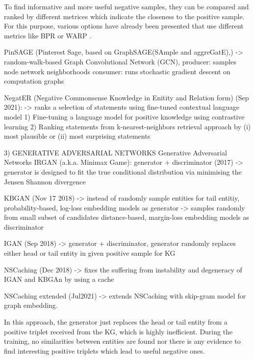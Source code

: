 To find informative and more useful negative samples, they can be compared and ranked by different metrices which indicate the closeness to the positive sample.
For this purpose, various options have already been presented that use different metrics like \ac{BPR} \cite{DNS} or \ac{WARP} \cite{WARP}. 






    PinSAGE (Pinterest Sage, based on GraphSAGE(SAmple and aggreGatE),)
    -> random-walk-based Graph Convolutional Network (GCN),
    producer: samples node network neighborhoods
    consumer: runs stochastic gradient descent on computation graphs    


    NegatER (Negative Commonsense Knowledge in Enitity and Relation form) (Sep 2021):
    -> ranks a selection of statements using fine-tuned contextual language model
    1) Fine-tuning a language model for positive knowledge using contrastive learning
    2) Ranking statements from k-nearest-neighbors retrieval approach by (i) most plausible or (ii) most surprising statements
    
    
    
3) GENERATIVE ADVERSARIAL NETWORKS
    Generative Adversarial Networks
    IRGAN (a.k.a. Minimax Game): generator + discriminator  (2017) 
    -> generator is designed to fit the true conditional distribution via minimising the Jensen Shannon divergence
    
    KBGAN (Nov 17 2018)
    -> instead of randomly sample entities for tail entitiy,
    probability-based, log-loss embedding models as generator
    -> samples randomly from small subset of candidates
    distance-based, margin-loss embedding models as discriminator
    
    IGAN (Sep 2018) 
    -> generator + discriminator, generator randomly replaces either head or tail entity in given positive sample for KG
    
    NSCaching (Dec 2018)
    -> fixes the suffering from instability and degeneracy of IGAN and KBGAn by using a cache

    NSCaching extended (Jul2021)
    ->  extends NSCaching with skip-gram model for graph embedding. 
    
    
    
In this approach, the generator just replaces the head or tail entity from a positive triplet received from the \ac{KG}, which is highly inefficient.
    During the training, no similarities between entities are found nor there is any evidence to find interesting positive triplets which lead to useful negative ones.
    
